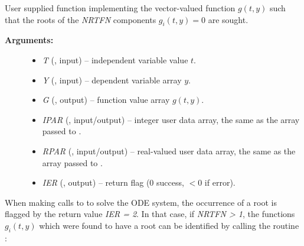 \documentclass[letterpaper,10pt,english]{sphinxmanual}
\begin{document}
\begin{fulllineitems}
\label{f_interface/Rootfinding:f/_/FARKROOTFN}
User supplied function implementing the vector-valued function
\(g(t,y)\) such that the roots of the \emph{NRTFN} components
\(g_i(t,y)=0\) are sought.
\begin{description}
\item[{\textbf{Arguments:}}] \leavevmode\begin{itemize}
\item {} 
\emph{T} (, input) -- independent variable value \(t\).

\item {} 
\emph{Y} (, input) -- dependent variable array \(y\).

\item {} 
\emph{G} (, output) -- function value array \(g(t,y)\).

\item {} 
\emph{IPAR} (, input/output) -- integer user data
array, the same as the array passed to {\hyperref[f_interface/Usage:f/_/FARKMALLOC]{\emph{}}}.

\item {} 
\emph{RPAR} (, input/output) -- real-valued user data
array, the same as the array passed to {\hyperref[f_interface/Usage:f/_/FARKMALLOC]{\emph{}}}.

\item {} 
\emph{IER}  (, output) -- return flag (0 success, \(<0\)
if error).

\end{itemize}

\end{description}

\end{fulllineitems}


When making calls to {\hyperref[f_interface/Usage:f/_/FARKODE]{\emph{}}} to solve the ODE system, the
occurrence of a root is flagged by the return value \emph{IER = 2}.  In
that case, if \emph{NRTFN \textgreater{} 1}, the functions \(g_i(t,y)\) which were
found to have a root can be identified by calling the routine
{\hyperref[f_interface/Rootfinding:f/_/FARKROOTINFO]{\emph{}}}:
\end{document}
